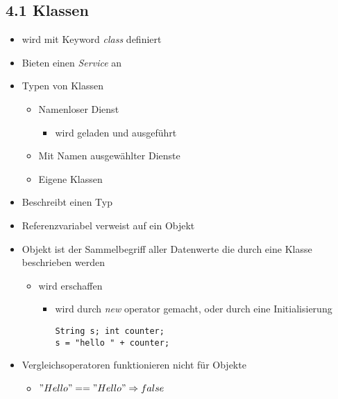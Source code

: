\documentclass[11pt]{article}
\begin{document}
\subsection{4.1 Klassen}
\label{sec:orgbeccfa2}
\begin{itemize}
\item wird mit Keyword \emph{class} definiert\\
\item Bieten einen \emph{Service} an\\
\item Typen von Klassen\\
\begin{itemize}
\item Namenloser Dienst\\
\begin{itemize}
\item wird geladen und ausgeführt\\
\end{itemize}
\item Mit Namen ausgewählter Dienste\\
\item Eigene Klassen\\
\end{itemize}
\item Beschreibt einen Typ\\
\item Referenzvariabel verweist auf ein Objekt\\
\item Objekt ist der Sammelbegriff aller Datenwerte die durch eine Klasse beschrieben werden\\
\begin{itemize}
\item wird erschaffen\\
\begin{itemize}
\item wird durch \emph{new} operator gemacht, oder durch eine Initialisierung\\
\begin{verbatim}
String s; int counter;
s = "hello " + counter;
\end{verbatim}
\end{itemize}
\end{itemize}
\item Vergleichsoperatoren funktionieren nicht für Objekte\\
\begin{itemize}
\item \("Hello" == "Hello" \Rightarrow false\)\\

\end{itemize}
\end{itemize}
\end{document}
